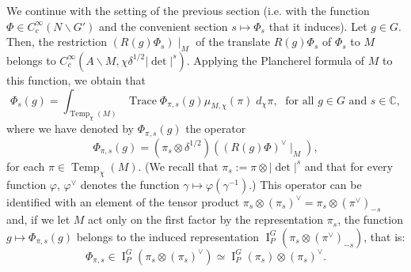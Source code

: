 \documentclass[12pt]{article}
\numberwithin{equation}{section}
\def\bC{\mathbb{C}}
\DeclareMathOperator{\Tr}{Trace}
\DeclareMathOperator{\Temp}{Temp}
\DeclareMathOperator{\rI}{\mathrm{I}}
\begin{document}
	We continue with the setting of the previous section (i.e. with the function $\Phi\in C_c^\infty(N\backslash G')$ and the convenient section $s\mapsto \Phi_s$ that it induces). Let $g\in G$. Then, the restriction $(R(g)\Phi_s)\mid_M$ of the translate $R(g)\Phi_s$ of $\Phi_s$ to $M$ belongs to $C_c^\infty(A\backslash M, \chi \delta^{1/2} \lvert \det\rvert^s)$. Applying the Plancherel formula of $M$ to this function, we obtain that
	\begin{equation}\label{eq5}
		\displaystyle \Phi_s(g)=\int_{\Temp_\chi(M)} \Tr \Phi_{\pi,s}(g) \mu_{M,\chi}(\pi)\; d_\chi \pi,\;\mbox{ for all } g\in G \mbox{ and } s\in \bC,
	\end{equation}
	where we have denoted by $\Phi_{\pi,s}(g)$ the operator
	$$\displaystyle \Phi_{\pi,s}(g)=(\pi_s\otimes \delta^{1/2})((R(g)\Phi)^\vee\mid_M),$$
	for each $\pi\in \Temp_\chi(M)$. (We recall that $\pi_{s}:=\pi \otimes \lvert \det\rvert^{s}$ and that for every function $\varphi$, $\varphi^\vee$ denotes the function $\gamma\mapsto \varphi(\gamma^{-1})$.) This operator can be identified with an element of the tensor product $\pi_s\otimes (\pi_s)^\vee=\pi_s\otimes (\pi^\vee)_{-s}$ and, if we let $M$ act only on the first factor by the representation $\pi_s$, the function $g\mapsto \Phi_{\pi,s}(g)$ belongs to the induced representation $\rI_{P}^G(\pi_s\otimes (\pi^\vee)_{-s})$, that is:
	\begin{equation}\label{eq6}
		\displaystyle \Phi_{\pi,s}\in \rI_{P}^G(\pi_s\otimes (\pi_s)^\vee)\simeq \rI_{P}^G(\pi_s)\otimes (\pi_s)^\vee.
	\end{equation}
	
\end{document}
